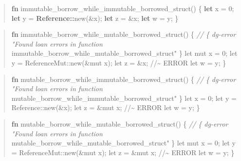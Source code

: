 \documentclass[
  11pt,
  twoside]{report}
\newenvironment{Shaded}{}{}
\newcommand{\CommentTok}[1]{\textit{#1}}
\newcommand{\DecValTok}[1]{#1}
\newcommand{\KeywordTok}[1]{\textbf{#1}}
\newcommand{\NormalTok}[1]{#1}
\newcommand{\OperatorTok}[1]{#1}
\newcommand{\PreprocessorTok}[1]{\textbf{#1}}
\newcommand{\StringTok}[1]{#1}
\begin{document}
\begin{quote}
\begin{Shaded}
\begin{Highlighting}[]
\KeywordTok{fn}\NormalTok{ immutable\_borrow\_while\_immutable\_borrowed\_struct() }\OperatorTok{\{}
    \KeywordTok{let}\NormalTok{ x }\OperatorTok{=} \DecValTok{0}\OperatorTok{;}
    \KeywordTok{let}\NormalTok{ y }\OperatorTok{=} \PreprocessorTok{Reference::}\NormalTok{new(}\OperatorTok{\&}\NormalTok{x)}\OperatorTok{;}
    \KeywordTok{let}\NormalTok{ z }\OperatorTok{=} \OperatorTok{\&}\NormalTok{x}\OperatorTok{;}
    \KeywordTok{let}\NormalTok{ w }\OperatorTok{=}\NormalTok{ y}\OperatorTok{;}
\OperatorTok{\}}
\end{Highlighting}
\end{Shaded}
\end{quote}

\begin{quote}
\begin{Shaded}
\begin{Highlighting}[]
\KeywordTok{fn}\NormalTok{ immutable\_borrow\_while\_mutable\_borrowed\_struct() }\OperatorTok{\{}
    \CommentTok{// \{ dg{-}error "Found loan errors in function}
\NormalTok{         immutable\_borrow\_while\_mutable\_borrowed\_struct}\StringTok{" \}}
\StringTok{    let mut x = 0;}
\StringTok{    let y = ReferenceMut::new(\&mut x);}
\StringTok{    let z = \&x; //\textasciitilde{} ERROR}
\StringTok{    let w = y;}
\StringTok{\}}
\end{Highlighting}
\end{Shaded}
\end{quote}

\begin{quote}
\begin{Shaded}
\begin{Highlighting}[]
\KeywordTok{fn}\NormalTok{ mutable\_borrow\_while\_immutable\_borrowed\_struct() }\OperatorTok{\{}
    \CommentTok{// \{ dg{-}error "Found loan errors in function}
\NormalTok{         mutable\_borrow\_while\_immutable\_borrowed\_struct}\StringTok{" \}}
\StringTok{    let x = 0;}
\StringTok{    let y = Reference::new(\&x);}
\StringTok{    let z = \&mut x; //\textasciitilde{} ERROR}
\StringTok{    let w = y;}
\StringTok{\}}
\end{Highlighting}
\end{Shaded}
\end{quote}

\begin{quote}
\begin{Shaded}
\begin{Highlighting}[]
\KeywordTok{fn}\NormalTok{ mutable\_borrow\_while\_mutable\_borrowed\_struct() }\OperatorTok{\{}
    \CommentTok{// \{ dg{-}error "Found loan errors in function}
\NormalTok{         mutable\_borrow\_while\_mutable\_borrowed\_struct}\StringTok{" \}}
\StringTok{    let mut x = 0;}
\StringTok{    let y = ReferenceMut::new(\&mut x);}
\StringTok{    let z = \&mut x; //\textasciitilde{} ERROR}
\StringTok{    let w = y;}
\StringTok{\}}
\end{Highlighting}
\end{Shaded}
\end{quote}
\end{document}
